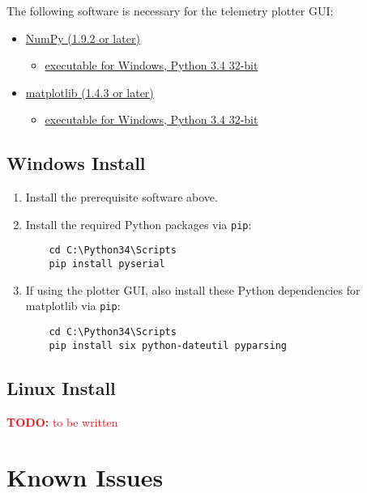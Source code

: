 \documentclass[11pt]{article}
\newcommand{\todo}[1]{\textcolor{red}{\textbf{TODO:} #1}}
\begin{document}
The following software is necessary for the telemetry plotter GUI:
\begin{itemize}
  \item \href{http://sourceforge.net/projects/numpy/files/NumPy/}{NumPy (1.9.2 or later)}
  \begin{itemize}
    \item \href{http://sourceforge.net/projects/numpy/files/NumPy/1.9.2/numpy-1.9.2-win32-superpack-python3.4.exe/download}{executable for Windows, Python 3.4 32-bit}
  \end{itemize}
  \item \href{http://matplotlib.org/downloads.html}{matplotlib (1.4.3 or later)}
  \begin{itemize}
    \item \href{http://sourceforge.net/projects/matplotlib/files/matplotlib/matplotlib-1.4.3/windows/matplotlib-1.4.3.win32-py3.4.exe/download}{executable for Windows, Python 3.4 32-bit}
  \end{itemize}
\end{itemize}

\subsection{Windows Install}
\begin{enumerate}
  \item Install the prerequisite software above.
  \item Install the required Python packages via \texttt{pip}:
  \begin{verbatim}
    cd C:\Python34\Scripts
    pip install pyserial 
  \end{verbatim}
  \item If using the plotter GUI, also install these Python dependencies for matplotlib via \texttt{pip}:
  \begin{verbatim}
    cd C:\Python34\Scripts
    pip install six python-dateutil pyparsing
  \end{verbatim}
\end{enumerate}

\subsection{Linux Install}
\todo{to be written}

\section{Known Issues}
\end{document}
